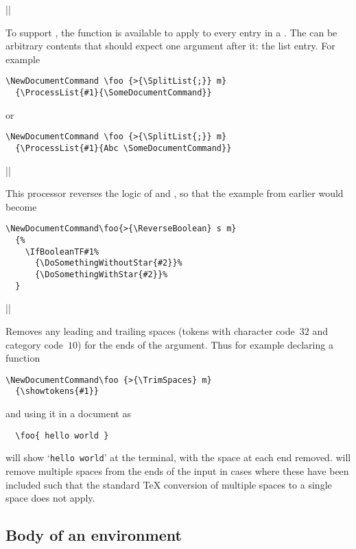 \documentclass{ltxguide}
\begin{document}
\begin{decl}
  |\ProcessList|  
\end{decl}
To support , the function  is available
to apply  to every entry in a . The
 can be arbitrary contents that should expect one argument
after it: the list entry. For example
\begin{verbatim}
\NewDocumentCommand \foo {>{\SplitList{;}} m}
  {\ProcessList{#1}{\SomeDocumentCommand}}
\end{verbatim}
or
\begin{verbatim}
\NewDocumentCommand \foo {>{\SplitList{;}} m}
  {\ProcessList{#1}{Abc \SomeDocumentCommand}}
\end{verbatim}

\begin{decl}
  |\ReverseBoolean|
\end{decl}
This processor reverses the logic of  and
, so that the example from earlier would become
\begin{verbatim}
\NewDocumentCommand\foo{>{\ReverseBoolean} s m}
  {%
    \IfBooleanTF#1%
      {\DoSomethingWithoutStar{#2}}%
      {\DoSomethingWithStar{#2}}%
  }
\end{verbatim}

\begin{decl}
  |\TrimSpaces|
\end{decl}
Removes any leading and trailing spaces (tokens with character code~$32$
and category code~$10$) for the ends of the argument. Thus for example
declaring a function
\begin{verbatim}
\NewDocumentCommand\foo {>{\TrimSpaces} m}
  {\showtokens{#1}}
\end{verbatim}
and using it in a document as
\begin{flushleft}
  \verb=  =\verb*=\foo{ hello world }=
\end{flushleft}
will show `\verb*=hello world=' at the terminal, with the space at each
end removed.  will remove multiple spaces from the ends of
the input in cases where these have been included such that the standard
\TeX{} conversion of multiple spaces to a single space does not apply.

\subsection{Body of an environment}
\label{sec:cmd:body}
\end{document}
